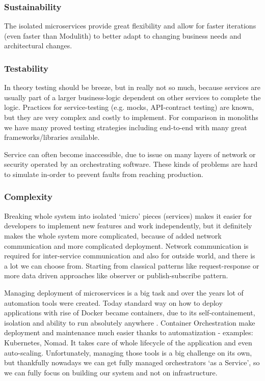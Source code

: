 \subsubsection{Sustainability}
The isolated microservices provide great flexibility and allow for faster iterations (even faster than Modulith) to better adapt to changing business needs and architectural changes.

\subsubsection{Testability}
In theory testing should be breeze, but in really not so much, because services are usually part of a larger business-logic dependent on other services to complete the logic. Practices for service-testing (e.g. mocks, API-contract testing) are known, but they are very complex and costly to implement. For comparison in  monoliths we have many proved testing strategies including end-to-end with many great frameworks/libraries available. \cite{MC_TESTABILITY}

Service can often become inaccessible, due to issue on many layers of network or security operated by an orchestrating software. These kinds of problems are hard to simulate in-order to prevent faults from reaching production.

\subsubsection{Complexity}
\label{section:microservices:complexity}
Breaking whole system into isolated `micro' pieces (services) makes it easier for developers to implement new features and work independently, but it definitely makes the whole system more complicated, because of added network communication and more complicated deployment. Network communication is required for inter-service communication and also for outside world, and there is a lot we can choose from. Starting from classical patterns like request-response or more data driven approaches like observer or publish-subscribe pattern.

Managing deployment of microservices is a big task and over the years lot of automation tools were created. Today standard way on how to deploy applications with rise of Docker became containers, due to its self-containement, isolation and ability to run absolutely anywhere \cite{7093032}. Container Orchestration make deployment and maintenance much easier thanks to automatization - examples: Kubernetes\cite{KUBERNETES}, Nomad\cite{NOMAD}. It takes care of whole lifecycle of the application and even auto-scaling. Unfortunately, managing those tools is a big challenge on its own, but thankfully nowadays we can get fully managed orchestrators `as a Service', so we can fully focus on building our system and not on infrastructure.

